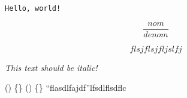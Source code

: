 \texttt{Hello, world!}


\begin{equation}
    \frac{nom}{denom}
\end{equation}

\begin{equation*}
    flsjflsjfljslfj
\end{equation*}

\textit{This text should be italic!}

\alpha \beta \gamma \Gamma \delta \Delta \epsilon \varepsilon \zeta \eta \theta \vartheta \Theta \kappa \lambda \mu \nu \xi \Xi \pi \Pi \rho \sigma \Sigma \tau \phi \varphi \Phi \chi \psi \Psi \omega \Omega
 \big(\big)
 \big\{\big\}
 \big[\big]
 \left(\right)
 \left[\right]
 \left\{\right\}
 ``flasdlfajdf''lfsdlflsdflc

\documentclass[a4paper]{article}


\begin{figure}[htb!]
  \centering
  \texttt{[image: bla-bla.jpg]}
  \caption{Hello, world!}
  \label{fig:number-one}
\end{figure}

\begin{quote}
Using VimTeX is lots of fun!
\end{quote}

\begin{itemize}
    \item Hello, World!
    \item It's me :)
\end{itemize}


 \left(A + b\right)
 $1 + 1 = 2$

 \section{I}
 \subsection{I.1}
 Hello, H2
 \subsection{I.2}
 Hello,
 \subsubsection{I.2.1}
 Hello, world


 \section{} 

